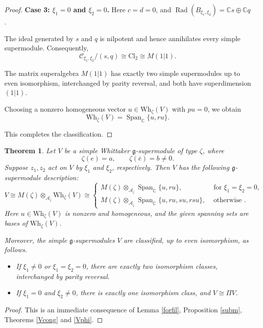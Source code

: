 \documentclass[a4paper,10pt]{article}
\theoremstyle{definition}
\theoremstyle{plain}
\newtheorem{theorem}[definition]{Theorem}
\theoremstyle{remark}
\theoremstyle{mystyle}
\numberwithin{equation}{section}
\begin{document}
\begin{proof}
\medskip

\noindent\textbf{Case 3:
$\xi_1=0$ and $\xi_2=0$.}
Here \(c=d=0\), and $\operatorname{Rad}(B_{\xi_1,\xi_2})=\mathbb Cs\oplus\mathbb Cq$.

The ideal generated by \(s\) and \(q\) is nilpotent and hence annihilates every simple supermodule. Consequently,
\[
\mathcal C_{\xi_1,\xi_2}/(s,q)
\cong\mathrm{Cl}_2
\cong M(1|1).
\]

The matrix superalgebra \(M(1|1)\) has exactly two simple supermodules up to even isomorphism, interchanged by parity reversal, and both have superdimension \((1|1)\).

Choosing a nonzero homogeneous vector \(u\in \mathrm{Wh}_{\zeta}(V)\) with \(pu=0\), we obtain 
\[
\mathrm{Wh}_\zeta(V)
=
\operatorname{Span}_{\mathbb C}\{u,ru\}.
\]

This completes the classification.
\end{proof}
\begin{theorem}\label{Vphi2}
Let $V$ be a simple Whittaker $\mathfrak g$-supermodule of type $\zeta$, where
\[
\zeta(e)=a,\qquad \zeta(\bar e)=b\neq 0.
\]
Suppose $z_1,z_2$ act on $V$ by $\xi_1$ and $\xi_2$, respectively. Then $V$ has the following $\mathfrak g$-supermodule description:
\[
    V\cong M(\zeta)\otimes _{\mathcal A_{\zeta}}\mathrm{Wh}_{\zeta}(V)\cong 
    \begin{cases}
    M(\zeta)\otimes _{\mathcal A_{\zeta}} \operatorname{Span}_{\mathbb C}\{u,ru\},
    &\text{ for }\xi_1=\xi_2=0,\\
    M(\zeta)\otimes _{\mathcal A_{\zeta}} \operatorname{Span}_{\mathbb C}\{u,ru,su,rsu\},&\text{ otherwise }.
    \end{cases}
\]
Here \(u\in \mathrm{Wh}_{\zeta}(V)\) is nonzero and homogeneous, and the given spanning sets are bases of \(\mathrm{Wh}_{\zeta}(V)\).

Moreover, the simple $\mathfrak g$-supermodules \(V\) are classified, up to even isomorphism, as follows.
    \begin{itemize}
        \item[(1).] If \(\xi_1\neq0\) or $\xi_1=\xi_2=0$, there are exactly two isomorphism classes, interchanged by parity reversal.
        \item[(2).] If \(\xi_1=0\) and \(\xi_2\neq0\), there is exactly one isomorphism class, and \(V\cong\Pi V\).
    \end{itemize}
\end{theorem}
\begin{proof}
    This is an immediate consequence of Lemma \ref{forfil}, Proposition \ref{subm}, Theorems \ref{Vcong} and \ref{Vphi}.
\end{proof}
\end{document}
